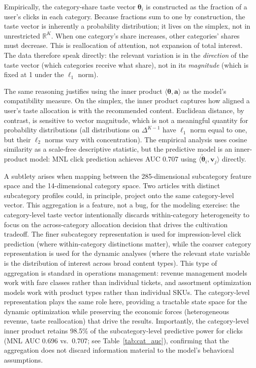 \documentclass[11pt]{article}
\newcommand{\R}{\mathbb{R}}
\begin{document}
Empirically, the category-share taste vector $\boldsymbol{\theta}_i$ is constructed as the fraction of a user's clicks in each category. Because fractions sum to one by construction, the taste vector is inherently a probability distribution; it lives on the simplex, not in unrestricted $\R^K$. When one category's share increases, other categories' shares must decrease. This is reallocation of attention, not expansion of total interest. The data therefore speak directly: the relevant variation is in the \emph{direction} of the taste vector (which categories receive what share), not in its \emph{magnitude} (which is fixed at 1 under the $\ell_1$ norm).

The same reasoning justifies using the inner product $\langle \boldsymbol{\theta}, \mathbf{a} \rangle$ as the model's compatibility measure. On the simplex, the inner product captures how aligned a user's taste allocation is with the recommended content. Euclidean distance, by contrast, is sensitive to vector magnitude, which is not a meaningful quantity for probability distributions (all distributions on $\Delta^{K-1}$ have $\ell_1$ norm equal to one, but their $\ell_2$ norms vary with concentration). The empirical analysis uses cosine similarity as a scale-free descriptive statistic, but the predictive model is an inner-product model: MNL click prediction achieves AUC 0.707 using $\langle \tilde{\boldsymbol{\theta}}_i, \mathbf{v}_j \rangle$ directly.

A subtlety arises when mapping between the 285-dimensional subcategory feature space and the 14-dimensional category space. Two articles with distinct subcategory profiles could, in principle, project onto the same category-level vector. This aggregation is a feature, not a bug, for the modeling exercise: the category-level taste vector intentionally discards within-category heterogeneity to focus on the across-category allocation decision that drives the cultivation tradeoff. The finer subcategory representation is used for impression-level click prediction (where within-category distinctions matter), while the coarser category representation is used for the dynamic analyses (where the relevant state variable is the distribution of interest across broad content types). This type of aggregation is standard in operations management: revenue management models work with fare classes rather than individual tickets, and assortment optimization models work with product types rather than individual SKUs. The category-level representation plays the same role here, providing a tractable state space for the dynamic optimization while preserving the economic forces (heterogeneous revenue, taste reallocation) that drive the results. Importantly, the category-level inner product retains 98.5\% of the subcategory-level predictive power for clicks (MNL AUC 0.696 vs.\ 0.707; see Table~\ref{tab:cat_auc}), confirming that the aggregation does not discard information material to the model's behavioral assumptions.
\end{document}
